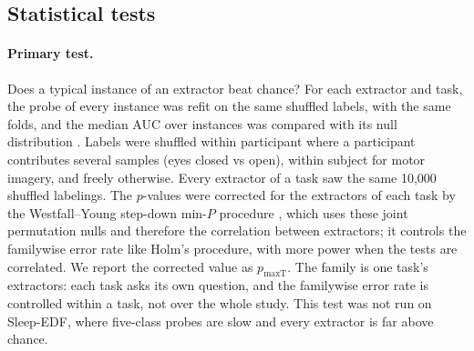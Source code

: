 \documentclass[11pt]{article}
\begin{document}
\subsection{Statistical tests}\label{sec:tests}
\paragraph{Primary test.} Does a typical instance of an extractor beat chance? For each
extractor and task, the probe of every instance was refit on the same shuffled labels, with the
same folds, and the median AUC over instances was compared with its null distribution
\citep{ojala2010}. Labels were shuffled within participant where a participant contributes several
samples (eyes closed vs open), within subject for motor imagery, and freely otherwise. Every
extractor of a task saw the same 10,000 shuffled labelings. The $p$-values were corrected for the
extractors of each task by the Westfall--Young step-down min-$P$ procedure \citep{westfall1993},
which uses these joint permutation nulls and therefore the correlation between extractors; it
controls the familywise error rate like Holm's procedure, with more power when the tests are
correlated. We report the corrected value as $p_\text{maxT}$. The family is one task's extractors: each task
asks its own question, and the familywise error rate is controlled within a task, not over the
whole study. This test was not run on Sleep-EDF,
where five-class probes are slow and every extractor is far above chance.
\end{document}
